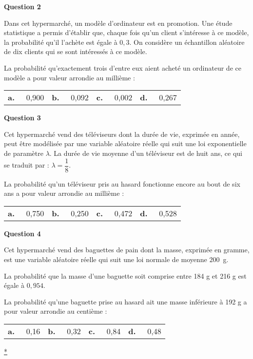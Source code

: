 \documentclass[10pt]{article}
\begin{document}
\textbf{Question 2}
 
Dans cet hypermarché, un modèle d'ordinateur est en promotion. Une étude statistique a permis d'établir que, chaque fois qu'un client s'intéresse à ce modèle, la probabilité qu'il l'achète est égale à $0,3$. On considère un échantillon aléatoire de dix clients qui se sont intéressés à ce modèle.
 
La probabilité qu'exactement trois d'entre eux aient acheté un ordinateur de ce modèle a pour valeur arrondie au millième :

\medskip
\begin{tabularx} {\linewidth}{*{4}{X}}
\textbf{a.~~} 0,900& 
\textbf{b.~~} 0,092& 
\textbf{c.~~} 0,002& 
\textbf{d.~~} 0,267
\end{tabularx}
\medskip
 
\textbf{Question 3}
 
Cet hypermarché vend des téléviseurs dont la durée de vie, exprimée en année, peut être modélisée par une variable aléatoire réelle qui suit une loi exponentielle de paramètre $\lambda$. La durée de vie 
moyenne d'un téléviseur est de huit ans, ce qui se traduit par : $\lambda = \dfrac{1}{8}$. 
 
La probabilité qu'un téléviseur pris au hasard fonctionne encore au bout de six ans a pour valeur arrondie au millième :

\medskip
\begin{tabularx} {\linewidth}{*{4}{X}}
\textbf{a.~~} 0,750& 
\textbf{b.~~} 0,250& 
\textbf{c.~~} 0,472& 
\textbf{d.~~} 0,528
\end{tabularx}
\medskip
 
\textbf{Question 4}
 
Cet hypermarché vend des baguettes de pain dont la masse, exprimée en gramme, est une variable aléatoire réelle qui suit une loi normale de moyenne $200$~g. 

La probabilité que la masse d'une baguette soit comprise entre 184 g et 216 g est égale à $0,954$. 

La probabilité qu'une baguette prise au hasard ait une masse inférieure à 192 g a pour valeur arrondie au centième :

\medskip
\begin{tabularx} {\linewidth}{*{4}{X}} 
\textbf{a.~~} 0,16& 
\textbf{b.~~} 0,32& 
\textbf{c.~~} 0,84& 
\textbf{d.~~} 0,48 
\end{tabularx}
\medskip 

\hyperlink{Index}{*}
\end{document}
